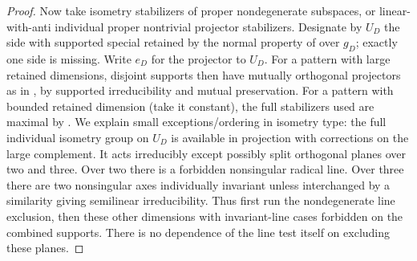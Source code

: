 \begin{proof}

Now take isometry stabilizers of proper nondegenerate subspaces, or linear-with-anti individual proper
nontrivial projector stabilizers. Designate by \(U_D\) the side with supported special retained by the
normal property of  over \(g_D\); exactly one side is missing. Write \(e_D\) for
the projector to \(U_D\). For a pattern with large retained dimensions, disjoint supports then have
mutually orthogonal projectors as in , by supported
irreducibility and mutual preservation. For a pattern with bounded retained dimension (take it constant),
the full stabilizers used are maximal by . We explain small
exceptions/ordering in isometry type: the full individual isometry group on \(U_D\) is available in
projection with corrections on the large complement. It acts irreducibly except possibly split orthogonal
planes over two and three. Over two there is a forbidden nonsingular radical line. Over three there are
two nonsingular axes individually invariant unless interchanged by a similarity giving semilinear
irreducibility. Thus first run the nondegenerate line exclusion, then these other dimensions with
invariant-line cases forbidden on the combined supports. There is no dependence of the line test itself
on excluding these planes.


\end{proof}
